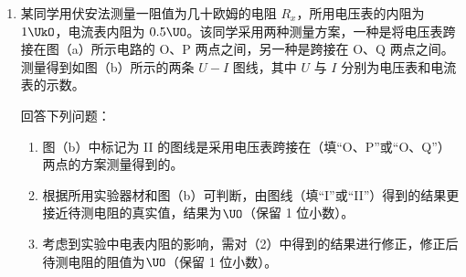 \documentclass[\gkver]{gaokaozhenti}
\begin{document}
\begin{enumerate}
{$v_{2}-v_{1}=\frac{FRm_{1}}{B^{2}L^{2}(m_{1}+m_{2})}$

大小恒定。整个运动过程用速度时间图象描述如下。


综上可得，金属框的加速度趋于恒定值，安培力也趋于恒定值，BC 选项正确；

金属框的速度会一直增大，导体棒到金属框 $bc$ 边的距离也会一直增大，AD 选项错误。

故选 BC。
}

\item
某同学用伏安法测量一阻值为几十欧姆的电阻 $R_{x}$，所用电压表的内阻为 $1\UkO$，电流表内阻为 $0.5\UO$。该同学采用两种测量方案，一种是将电压表跨接在图（a）所示电路的 O、P 两点之间，另一种是跨接在 O、Q 两点之间。测量得到如图（b）所示的两条 $U-I$ 图线，其中 $U$ 与 $I$ 分别为电压表和电流表的示数。



回答下列问题：
\begin{enumerate}
	\item
	图（b）中标记为 II 的图线是采用电压表跨接在（填“O、P”或“O、Q”）两点的方案测量得到的。

	\item
	根据所用实验器材和图（b）可判断，由图线（填“I”或“II”）得到的结果更接近待测电阻的真实值，结果为$\UO$（保留 1 位小数）。

	\item
	考虑到实验中电表内阻的影响，需对（2）中得到的结果进行修正，修正后待测电阻的阻值为$\UO$（保留 1 位小数）。
\end{enumerate}
\end{enumerate}
\end{document}
